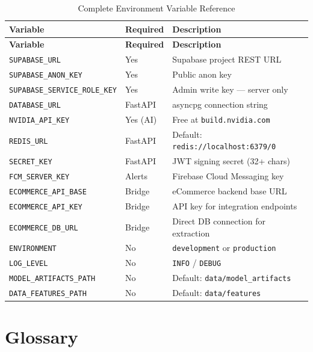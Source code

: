 \documentclass[12pt, a4paper, oneside]{report}
\begin{document}
\begin{longtable}{@{} L{5.5cm} C{2.0cm} L{6.7cm} @{}}
\caption{Complete Environment Variable Reference}
\label{tab:env-full} \\
\toprule
\textbf{Variable} & \textbf{Required} & \textbf{Description} \\
\midrule
\endfirsthead
\toprule
\textbf{Variable} & \textbf{Required} & \textbf{Description} \\
\midrule
\endhead
\bottomrule
\endlastfoot
\texttt{SUPABASE\_URL}                 & Yes          & Supabase project REST URL \\
\texttt{SUPABASE\_ANON\_KEY}           & Yes          & Public anon key \\
\texttt{SUPABASE\_SERVICE\_ROLE\_KEY}  & Yes          & Admin write key --- server only \\
\texttt{DATABASE\_URL}                 & FastAPI      & asyncpg connection string \\
\texttt{NVIDIA\_API\_KEY}              & Yes (AI)     & Free at \texttt{build.nvidia.com} \\
\texttt{REDIS\_URL}                    & FastAPI      & Default: \texttt{redis://localhost:6379/0} \\
\texttt{SECRET\_KEY}                   & FastAPI      & JWT signing secret (32+ chars) \\
\texttt{FCM\_SERVER\_KEY}              & Alerts       & Firebase Cloud Messaging key \\
\texttt{ECOMMERCE\_API\_BASE}          & Bridge       & eCommerce backend base URL \\
\texttt{ECOMMERCE\_API\_KEY}           & Bridge       & API key for integration endpoints \\
\texttt{ECOMMERCE\_DB\_URL}            & Bridge       & Direct DB connection for extraction \\
\texttt{ENVIRONMENT}                   & No           & \texttt{development} or \texttt{production} \\
\texttt{LOG\_LEVEL}                    & No           & \texttt{INFO} / \texttt{DEBUG} \\
\texttt{MODEL\_ARTIFACTS\_PATH}        & No           & Default: \texttt{data/model\_artifacts} \\
\texttt{DATA\_FEATURES\_PATH}          & No           & Default: \texttt{data/features} \\
\end{longtable}

\chapter{Glossary}
\label{app:glossary}
\end{document}
